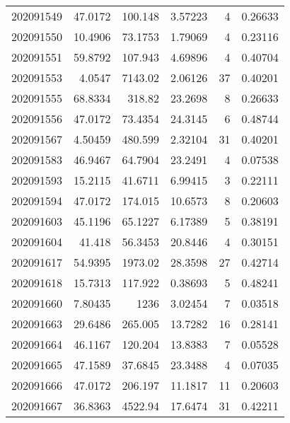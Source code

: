 \begin{tabular}{rrrrrr}
 202091549 &         47.0172  &      100.148  &            3.57223 &           4 & 0.26633 \\
 202091550 &         10.4906  &       73.1753 &            1.79069 &           4 & 0.23116 \\
 202091551 &         59.8792  &      107.943  &            4.69896 &           4 & 0.40704 \\
 202091553 &          4.0547  &     7143.02   &            2.06126 &          37 & 0.40201 \\
 202091555 &         68.8334  &      318.82   &           23.2698  &           8 & 0.26633 \\
 202091556 &         47.0172  &       73.4354 &           24.3145  &           6 & 0.48744 \\
 202091567 &          4.50459 &      480.599  &            2.32104 &          31 & 0.40201 \\
 202091583 &         46.9467  &       64.7904 &           23.2491  &           4 & 0.07538 \\
 202091593 &         15.2115  &       41.6711 &            6.99415 &           3 & 0.22111 \\
 202091594 &         47.0172  &      174.015  &           10.6573  &           8 & 0.20603 \\
 202091603 &         45.1196  &       65.1227 &            6.17389 &           5 & 0.38191 \\
 202091604 &         41.418   &       56.3453 &           20.8446  &           4 & 0.30151 \\
 202091617 &         54.9395  &     1973.02   &           28.3598  &          27 & 0.42714 \\
 202091618 &         15.7313  &      117.922  &            0.38693 &           5 & 0.48241 \\
 202091660 &          7.80435 &     1236      &            3.02454 &           7 & 0.03518 \\
 202091663 &         29.6486  &      265.005  &           13.7282  &          16 & 0.28141 \\
 202091664 &         46.1167  &      120.204  &           13.8383  &           7 & 0.05528 \\
 202091665 &         47.1589  &       37.6845 &           23.3488  &           4 & 0.07035 \\
 202091666 &         47.0172  &      206.197  &           11.1817  &          11 & 0.20603 \\
 202091667 &         36.8363  &     4522.94   &           17.6474  &          31 & 0.42211 \\

\end{tabular}
